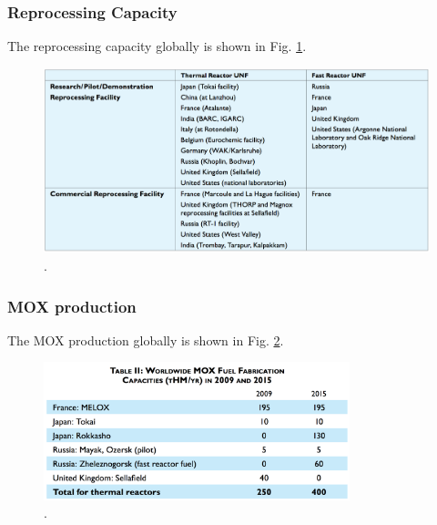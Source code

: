 
\begin{frame}
  \frametitle{Reprocessing Capacity}
  The reprocessing capacity globally is shown in Fig. \ref{fig:reprocessing-nn}.
  \begin{figure}[htbp!]
    \begin{center}
      \includegraphics[width=\textwidth]{./images/reprocessing-nn}
    \end{center}
          \caption{\cite{buckner_case_2016}.}
    \label{fig:reprocessing-nn}
  \end{figure}
\end{frame}

\begin{frame}
  \frametitle{MOX production}
  The MOX production globally is shown in Fig.
  \ref{fig:mox-production-nn}.
  \begin{figure}[htbp!]
    \begin{center}
      \includegraphics[height=4cm]{./images/mox-production-nn}
    \end{center}
          \caption{\cite{buckner_case_2016}.}
    \label{fig:mox-production-nn}
  \end{figure}
\end{frame}
